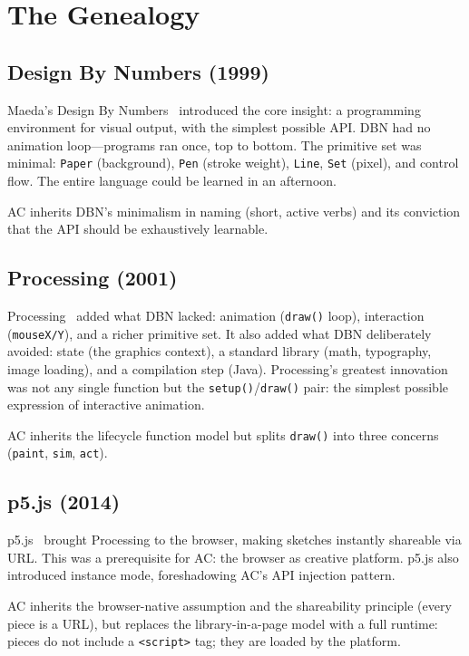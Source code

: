 \documentclass[10pt,letterpaper,twocolumn]{article}
\begin{document}
\section{The Genealogy}
\label{sec:genealogy}

\subsection{Design By Numbers (1999)}

Maeda's Design By Numbers~\citep{maeda2001dbn} introduced the core insight: a programming environment for visual output, with the simplest possible API. DBN had no animation loop---programs ran once, top to bottom. The primitive set was minimal: \texttt{Paper} (background), \texttt{Pen} (stroke weight), \texttt{Line}, \texttt{Set} (pixel), and control flow. The entire language could be learned in an afternoon.

AC inherits DBN's minimalism in naming (short, active verbs) and its conviction that the API should be exhaustively learnable.

\subsection{Processing (2001)}

Processing~\citep{reas2003processing} added what DBN lacked: animation (\texttt{draw()} loop), interaction (\texttt{mouseX/Y}), and a richer primitive set. It also added what DBN deliberately avoided: state (the graphics context), a standard library (math, typography, image loading), and a compilation step (Java). Processing's greatest innovation was not any single function but the \texttt{setup()}/\texttt{draw()} pair: the simplest possible expression of interactive animation.

AC inherits the lifecycle function model but splits \texttt{draw()} into three concerns (\texttt{paint}, \texttt{sim}, \texttt{act}).

\subsection{p5.js (2014)}

p5.js~\citep{mccarthy2015p5js} brought Processing to the browser, making sketches instantly shareable via URL. This was a prerequisite for AC: the browser as creative platform. p5.js also introduced instance mode, foreshadowing AC's API injection pattern.

AC inherits the browser-native assumption and the shareability principle (every piece is a URL), but replaces the library-in-a-page model with a full runtime: pieces do not include a \texttt{<script>} tag; they are loaded by the platform.
\end{document}
